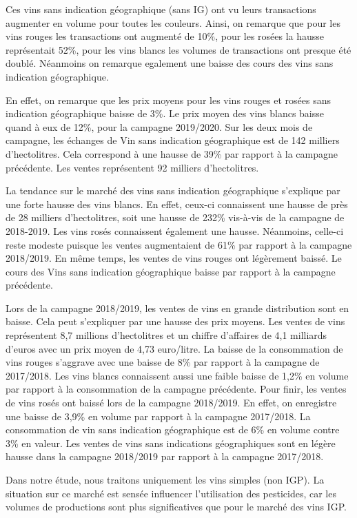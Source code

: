 \documentclass[11pt,]{article}
\begin{document}
Ces vins sans indication géographique (sans IG) ont vu leurs
transactions augmenter en volume pour toutes les couleurs. Ainsi, on
remarque que pour les vins rouges les transactions ont augmenté de 10\%,
pour les rosées la hausse représentait 52\%, pour les vins blancs les
volumes de transactions ont presque été doublé. Néanmoins on remarque
egalement une baisse des cours des vins sans indication géographique.

En effet, on remarque que les prix moyens pour les vins rouges et rosées
sans indication géographique baisse de 3\%. Le prix moyen des vins
blancs baisse quand à eux de 12\%, pour la campagne 2019/2020. Sur les
deux mois de campagne, les échanges de Vin sans indication géographique
est de 142 milliers d'hectolitres. Cela correspond à une hausse de 39\%
par rapport à la campagne précédente. Les ventes représentent 92
milliers d'hectolitres.

La tendance sur le marché des vins sans indication géographique
s'explique par une forte hausse des vins blancs. En effet, ceux-ci
connaissent une hausse de près de 28 milliers d'hectolitres, soit une
hausse de 232\% vis-à-vis de la campagne de 2018-2019. Les vins rosés
connaissent également une hausse. Néanmoins, celle-ci reste modeste
puisque les ventes augmentaient de 61\% par rapport à la campagne
2018/2019. En même temps, les ventes de vins rouges ont légèrement
baissé. Le cours des Vins sans indication géographique baisse par
rapport à la campagne précédente.

Lors de la campagne 2018/2019, les ventes de vins en grande distribution
sont en baisse. Cela peut s'expliquer par une hausse des prix moyens.
Les ventes de vins représentent 8,7 millions d'hectolitres et un chiffre
d'affaires de 4,1 milliards d'euros avec un prix moyen de 4,73
euro/litre. La baisse de la consommation de vins rouges s'aggrave avec
une baisse de 8\% par rapport à la campagne de 2017/2018. Les vins
blancs connaissent aussi une faible baisse de 1,2\% en volume par
rapport à la consommation de la campagne précédente. Pour finir, les
ventes de vins rosés ont baissé lors de la campagne 2018/2019. En effet,
on enregistre une baisse de 3,9\% en volume par rapport à la campagne
2017/2018. La consommation de vin sans indication géographique est de
6\% en volume contre 3\% en valeur. Les ventes de vins sans indications
géographiques sont en légère hausse dans la campagne 2018/2019 par
rapport à la campagne 2017/2018.

Dans notre étude, nous traitons uniquement les vins simples (non IGP).
La situation sur ce marché est sensée influencer l'utilisation des
pesticides, car les volumes de productions sont plus significatives que
pour le marché des vins IGP.
\end{document}
